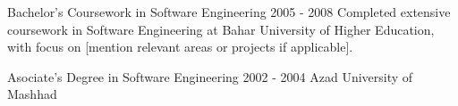 \documentclass[12pt]{developercv}
\begin{document}

\begin{entrylist}
	\entry
		{}
		{Bachelor's Coursework in Software Engineering}
		{2005 - 2008}
		{Completed extensive coursework in Software Engineering at Bahar University of Higher Education, with focus on [mention relevant areas or projects if applicable].}

	\entry
		{}
		{Asociate's Degree in Software Engineering}
		{2002 - 2004}
		{Azad University of Mashhad}
\end{entrylist}


%
%
%	
%	
%	
%	
%

\end{document}
